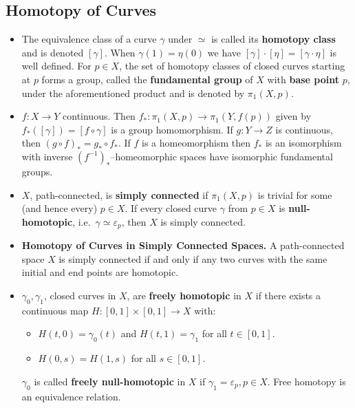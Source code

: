 \documentclass{article}
\newenvironment{topic}[1]{%
{\subsection{#1}}%
\begin{itemize}%
}{%
\end{itemize}%
}
\newcommand{\theorem}[1]{\item {\bf #1.}}
\newcommand{\term}[1]{{\bf #1}}
\newcommand{\remark}{\item}
\begin{document}
\begin{topic}{Homotopy of Curves}
\remark The equivalence class of a curve $\gamma$ under $\simeq$ is called its \term{homotopy class} and is denoted $[\gamma]$. When $\gamma(1) = \eta(0)$ we have $[\gamma] \cdot [\eta] = [\gamma \cdot \eta]$ is well defined. For $p \in X$, the set of homotopy classes of closed curves starting at $p$ forms a group, called the \term{fundamental group} of $X$ with \term{base point} $p$, under the aforementioned product and is denoted by $\pi_1(X, p)$.

\remark $f : X \to Y$ continuous. Then $f_\ast : \pi_1(X, p) \to \pi_1(Y, f(p))$ given by $f_\ast([\gamma]) = [f \circ \gamma]$ is a group homomorphism. If $g : Y \to Z$ is continuous, then $(g \circ f)_\ast = g_\ast \circ f_\ast$. If $f$ is a homeomorphism then $f_\ast$ is an isomorphism with inverse $(f^{-1})_\ast$--homeomorphic spaces have isomorphic fundamental groups.

\remark $X$, path-connected, is \term{simply connected} if $\pi_1(X, p)$ is trivial for some (and hence every) $p \in X$. If every closed curve $\gamma$ from $p \in X$ is \term{null-homotopic}, i.e.\ $\gamma \simeq \varepsilon_p$, then $X$ is simply connected.

\theorem{Homotopy of Curves in Simply Connected Spaces} A path-connected space $X$ is simply connected if and only if any two curves with the same initial and end points are homotopic.

\remark $\gamma_0, \gamma_1$, closed curves in $X$, are \term{freely homotopic} in $X$ if there exists a continuous map $H : [0, 1] \times [0, 1] \to X$ with:
\begin{itemize}
\item $H(t, 0) = \gamma_0(t)$ and $H(t, 1) = \gamma_1$ for all $t \in [0, 1]$.
\item $H(0, s) = H(1, s)$ for all $s \in [0, 1]$.
\end{itemize}
$\gamma_0$ is called \term{freely null-homotopic} in $X$ if $\gamma_1 = \varepsilon_p, p \in X$. Free homotopy is an equivalence relation.

\end{topic}
\end{document}
